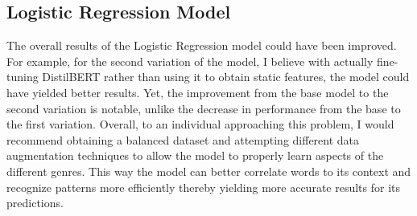 \subsection{Logistic Regression Model}
The overall results of the Logistic Regression model could have been improved. 
For example, for the second variation of the model, I believe with actually fine-tuning DistilBERT rather than using it to obtain static features, the model could have yielded better results. 
Yet, the improvement from the base model to the second variation is notable, unlike the decrease in performance from the base to the first variation. 
Overall, to an individual approaching this problem, I would recommend obtaining a balanced dataset and attempting different data augmentation techniques to allow the model to properly learn aspects of the different genres. 
This way the model can better correlate words to its context and recognize patterns more efficiently thereby yielding more accurate results for its predictions.